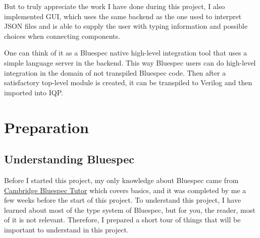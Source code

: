 \documentclass[12pt]{report}
\begin{document}
But to truly appreciate the work I have done during this project, I also implemented GUI, which uses the same backend as the one used to interpret JSON files and is able to supply the user with typing information and possible choices when connecting components.  

One can think of it as a Bluespec native high-level integration tool that uses a simple language server in the backend. This way Bluespec users can do high-level integration in the domain of not transpiled Bluespec code. Then after a satisfactory top-level module is created, it can be transpiled to Verilog and then imported into IQP. 

\chapter{Preparation}

\section{Understanding Bluespec}
Before I started this project, my only knowledge about Bluespec came from \href{https://www-bluespec.cl.cam.ac.uk/}{Cambridge Bluespec Tutor} which covers basics, and it was completed by me a few weeks before the start of this project. To understand this project, I have learned about most of the type system of Bluespec, but for you, the reader, most of it is not relevant. Therefore, I prepared a short tour of things that will be important to understand in this project. 
\end{document}
